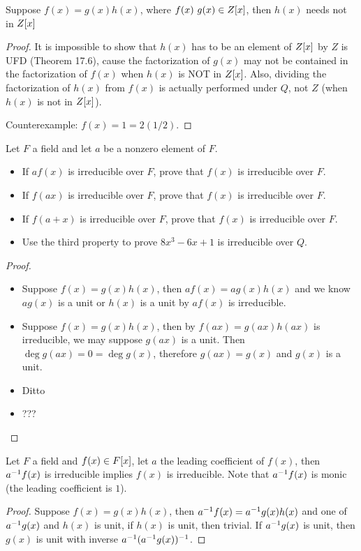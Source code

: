 \documentclass[../main.tex]{subfiles}
\begin{document}
\begin{mistake}
  Suppose $f(x) = g(x)h(x)$, where $f(x) \ g(x) \in Z[x]$, then
  $h(x)$ needs not in $Z[x]$
\end{mistake}
\begin{proof}
  It is impossible to show that $h(x)$ has to be an element of $Z[x]$ by
  $Z$ is UFD (Theorem 17.6), cause the factorization of $g(x)$ may not be contained
  in the factorization of $f(x)$ when $h(x)$ is NOT in $Z[x]$.
  Also, dividing the factorization of $h(x)$ from $f(x)$ is actually performed
  under $Q$, not $Z$ (when $h(x)$ is not in $Z[x]$).

  Counterexample: $f(x) = 1 = 2 (1/2)$.
\end{proof}

\begin{exercise}
  Let $F$ a field and let $a$ be a nonzero element of $F$.
  \begin{itemize}
    \item If $af(x)$ is irreducible over $F$, prove that $f(x)$
          is irreducible over $F$.
    \item If $f(ax)$ is irreducible over $F$, prove that $f(x)$
          is irreducible over $F$.
    \item If $f(a + x)$ is irreducible over $F$, prove that $f(x)$
          is irreducible over $F$.
    \item Use the third property to prove $8x^3 - 6x + 1$ is irreducible
          over $Q$.
  \end{itemize}
\end{exercise}
\begin{proof}
  ~
  \begin{itemize}
    \item Suppose $f(x) = g(x)h(x)$, then $af(x) = ag(x)h(x)$ and we know
          $ag(x)$ is a unit or $h(x)$ is a unit by $af(x)$ is irreducible.
    \item Suppose $f(x) = g(x)h(x)$, then by $f(ax) = g(ax)h(ax)$ is irreducible,
          we may suppose $g(ax)$ is a unit. Then $\deg g(ax) = 0 = \deg g(x)$,
          therefore $g(ax) = g(x)$ and $g(x)$ is a unit.
    \item Ditto
    \item ???
  \end{itemize}
\end{proof}

\begin{exercise}
  Let $F$ a field and $f(x) \in F[x]$, let $a$ the leading coefficient
  of $f(x)$, then $a^{-1}f(x)$ is irreducible implies $f(x)$ is irreducible.
  Note that $a^{-1}f(x)$ is monic (the leading coefficient is $1$).
\end{exercise}
\begin{proof}
  Suppose $f(x) = g(x)h(x)$, then $a^{-1}f(x) = a^{-1}g(x)h(x)$ and
  one of $a^{-1}g(x)$ and $h(x)$ is unit, if $h(x)$ is unit, then trivial.
  If $a^{-1}g(x)$ is unit, then $g(x)$ is unit with inverse $a^{-1}(a^{-1}g(x))^{-1}$.
\end{proof}
\end{document}
